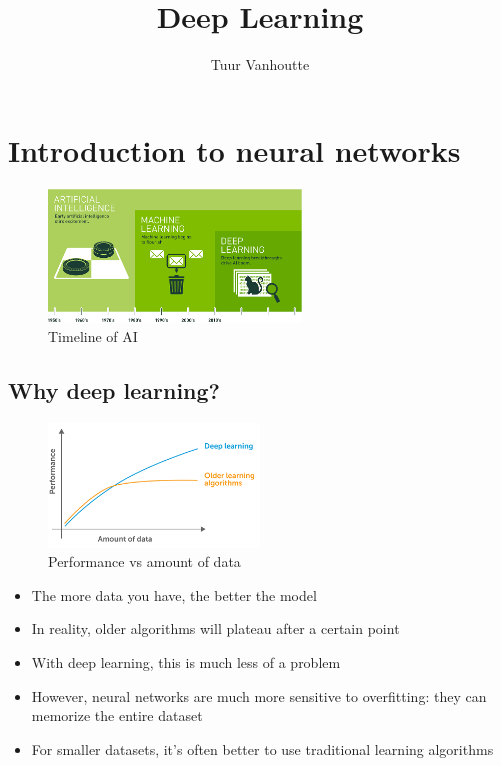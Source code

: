 \documentclass{article}
\begin{document}
\begin{titlepage}
    \author{Tuur Vanhoutte}
    \title{Deep Learning}
\end{titlepage}

\maketitle
\newpage
\tableofcontents
\newpage


\section{Introduction to neural networks}

\begin{figure}[H]
    \centering
    \includegraphics[width=0.6\textwidth]{ai-timeline.png}
    \caption{Timeline of AI}
\end{figure}

\subsection{Why deep learning?}

\begin{figure}[H]
    \centering
    \includegraphics[width=0.5\textwidth]{deep-learning-performance-vs-data.png}
    \caption{Performance vs amount of data}
\end{figure}

\begin{itemize}
    \item The more data you have, the better the model
    \item In reality, older algorithms will plateau after a certain point
    \item With deep learning, this is much less of a problem
    \item However, neural networks are much more sensitive to overfitting: they can memorize the entire dataset
    \item For smaller datasets, it's often better to use traditional learning algorithms
\end{itemize}
\end{document}

